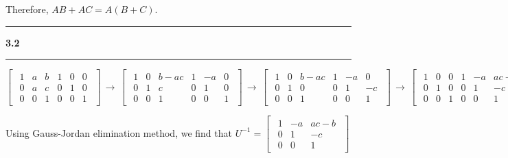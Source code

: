 \documentclass[11pt]{article}
\newcommand\question[2]{\vspace{.25in}\hrule\textbf{#1 #2}\vspace{.5em}\hrule\vspace{.10in}}
\begin{document}
Therefore, \(AB + AC = A(B + C)\).

\question{3.2}{}

\(\begin{bmatrix}\begin{array}{ccc|ccc} 1&a&b&1&0&0 \\ 0&a&c&0&1&0 \\ 0&0&1&0&0&1 \end{array}\end{bmatrix}\,\to\,\begin{bmatrix}\begin{array}{ccc|ccc} 1&0&b-ac&1&-a&0 \\ 0&1&c&0&1&0 \\ 0&0&1&0&0&1 \end{array}\end{bmatrix}\,\to\,
\begin{bmatrix}\begin{array}{ccc|ccc} 1&0&b-ac&1&-a&0 \\ 0&1&0&0&1&-c \\ 0&0&1&0&0&1 \end{array}\end{bmatrix}\,\to\,
\begin{bmatrix}\begin{array}{ccc|ccc} 1&0&0&1&-a&ac-b \\ 0&1&0&0&1&-c \\ 0&0&1&0&0&1 \end{array}\end{bmatrix}\)

Using Gauss-Jordan elimination method, we find that \(U^{-1} = \begin{bmatrix}\begin{array}{ccc} 1&-a&ac-b \\ 0&1&-c \\ 0&0&1 \end{array}\end{bmatrix}\)
\end{document}
